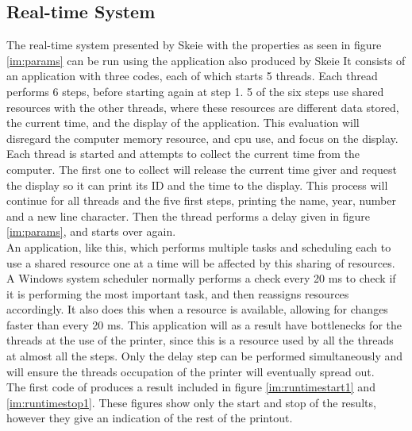 \documentclass[12pt, A4paper, english]{book}
\begin{document}
		\subsection{Real-time System}
The real-time system presented by Skeie \cite{task} with the properties as seen in figure \ref{im:params} can be run using the application also produced by Skeie \cite{app} It consists of an application with three codes, each of which starts 5 threads. Each thread performs 6 steps, before starting again at step 1. 5 of the six steps use shared resources with the other threads, where these resources are different data stored, the current time, and the display of the application. This evaluation will disregard the computer memory resource, and cpu use, and focus on the display. Each thread is started and attempts to collect the current time from the computer. The first one to collect will release the current time giver and request the display so it can print its ID and the time to the display. This process will continue for all threads and the five first steps, printing the name, year, number and a new line character. Then the thread performs a delay given in figure \ref{im:params}, and starts over again. \\
An application, like this, which performs multiple tasks and scheduling each to use a shared resource one at a time will be affected by this sharing of resources. A Windows system scheduler normally performs a check every 20 ms \cite{LN} to check if it is performing the most important task, and then reassigns resources accordingly. It also does this when a resource is available, allowing for changes faster than every 20 ms. This application will as a result have bottlenecks for the threads at the use of the printer, since this is a resource used by all the threads at almost all the steps. Only the delay step can be performed simultaneously and will ensure the threads occupation of the printer will eventually spread out. \\
The first code of \cite{app} produces a result included in figure \ref{im:runtimestart1} and \ref{im:runtimestop1}. These figures show only the start and stop of the results, however they give an indication of the rest of the printout. 
\end{document}
